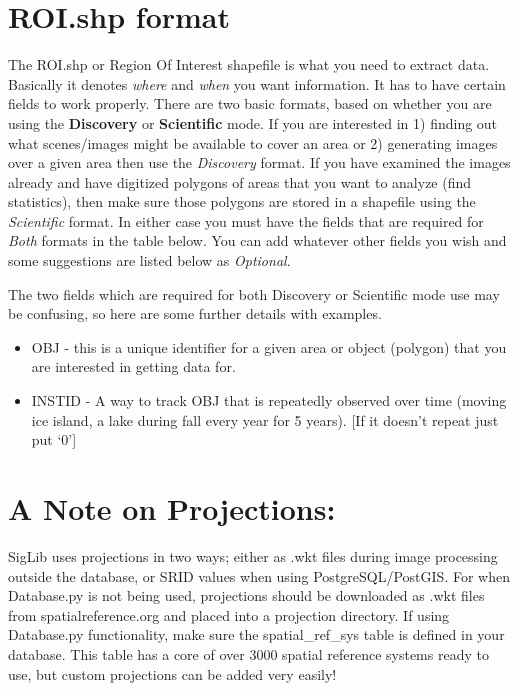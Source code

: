 \documentclass[letterpaper,10pt,openany,oneside]{sphinxmanual}
\begin{document}
\section{ROI.shp format}
\label{project:roi-shp-format}
The ROI.shp or Region Of Interest shapefile is what you need to extract
data. Basically it denotes \emph{where} and \emph{when} you want information. It
has to have certain fields to work properly. There are two basic
formats, based on whether you are using the \textbf{Discovery} or
\textbf{Scientific} mode. If you are interested in 1) finding out what
scenes/images might be available to cover an area or 2) generating
images over a given area then use the \emph{Discovery} format. If you have
examined the images already and have digitized polygons of areas that
you want to analyze (find statistics), then make sure those polygons are
stored in a shapefile using the \emph{Scientific} format. In either case you
must have the fields that are required for \emph{Both} formats in the table
below. You can add whatever other fields you wish and some suggestions
are listed below as \emph{Optional}.

The two fields which are required for both Discovery or Scientific mode
use may be confusing, so here are some further details with examples.
\begin{itemize}
\item {} 
OBJ - this is a unique identifier for a given area or object
(polygon) that you are interested in getting data for.

\item {} 
INSTID - A way to track OBJ that is repeatedly observed over time
(moving ice island, a lake during fall every year for 5 years). {[}If
it doesn't repeat just put `0'{]}

\end{itemize}


\section{A Note on Projections:}
\label{project:a-note-on-projections}
SigLib uses projections in two ways; either as .wkt files during image processing outside the database, or SRID values when using PostgreSQL/PostGIS. For when Database.py is not being used, projections should be downloaded as .wkt files from spatialreference.org and placed into a projection directory. If using Database.py functionality, make sure the spatial\_ref\_sys table is defined in your database. This table has a core of over 3000 spatial reference systems ready to use, but custom projections can be added very easily!
\end{document}
